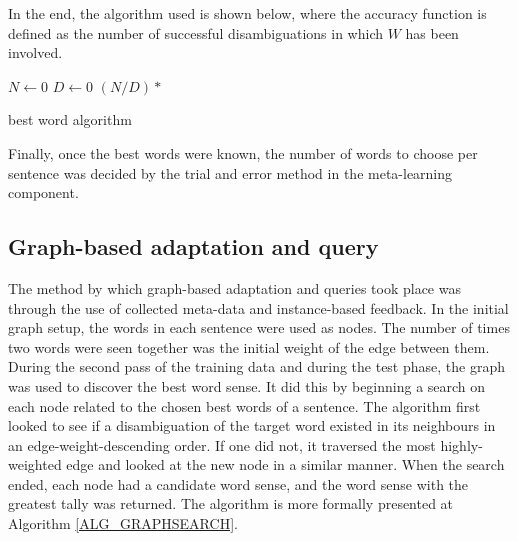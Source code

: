 In the end, the algorithm used is shown below, where the accuracy function is defined as the number of
successful disambiguations in which $W$ has been involved.

\IncMargin{1em}
\begin{algorithm}
\DontPrintSemicolon
{}
\BlankLine
	$N \longleftarrow 0$\;
	$D \longleftarrow 0$\;
	\Return $(N / D) *$ \;
\caption{best word algorithm \label{ALG_BESTWORDS}}
\end{algorithm}\DecMargin{1em}

Finally, once the best words were known, the number of words to choose per
sentence was decided by the trial and error method in the meta-learning component.

\subsection{Graph-based adaptation and query}

The method by which graph-based adaptation and queries took place was through the use of
collected meta-data and instance-based feedback.  In the initial graph
setup, the words in each sentence were used as nodes. The number of times two words 
were seen together was the initial weight of the edge between them. During the second pass 
of the training data and during the test phase, the graph was used to discover the best 
word sense. It did this by beginning a search on each node related to the chosen 
best words of a sentence. The algorithm first looked to see if a disambiguation 
of the target word existed in its neighbours in an edge-weight-descending order. 
If one did not, it traversed the most highly-weighted edge and looked at the new node 
in a similar manner.  When the search ended, each node had a candidate 
word sense, and the word sense with the greatest tally was returned. The algorithm is 
more formally presented at Algorithm \ref{ALG_GRAPHSEARCH}.

